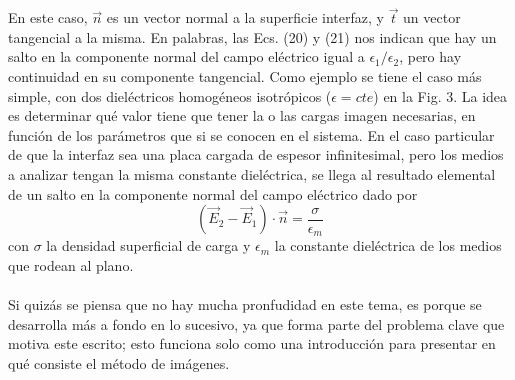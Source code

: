 \documentclass[12pt, notitlepage]{article}
\begin{document}
En este caso, $\vec{n}$ es un vector normal a la superficie interfaz, y $\vec{t}$ un vector tangencial a la misma. En palabras, las Ecs. (20) y (21) nos indican que hay un salto en la componente normal del campo eléctrico igual a $\epsilon_1/\epsilon_2$, pero hay continuidad en su componente tangencial. Como ejemplo se tiene el caso más simple, con dos dieléctricos homogéneos isotrópicos ($\epsilon = cte$) en la Fig. 3.
La idea es determinar qué valor tiene que tener la o las cargas imagen necesarias, en función de los parámetros que si se conocen en el sistema. En el caso particular de que la interfaz sea una placa cargada de espesor infinitesimal, pero los medios a analizar tengan la misma constante dieléctrica, se llega al resultado elemental de un salto en la componente normal del campo eléctrico dado por
\begin{equation}
(\vec{E}_2 - \vec{E}_1)\cdot\vec{n} = \frac{\sigma}{\epsilon_m}
\end{equation}
con $\sigma$ la densidad superficial de carga y $\epsilon_m$ la constante dieléctrica de los medios que rodean al plano.\\\\
Si quizás se piensa que no hay mucha pronfudidad en este tema, es porque se desarrolla más a fondo en lo sucesivo, ya que forma parte del problema clave que motiva este escrito; esto funciona solo como una introducción para presentar en qué consiste el método de imágenes.










\end{document}
